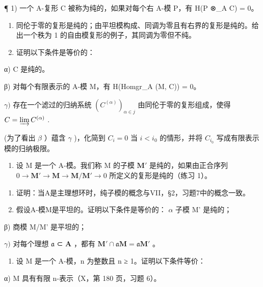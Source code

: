 
¶ 1) 一个 A-复形 C 被称为纯的，如果对每个右 A-模 P，有 H(P ⊗\_A C) = 0。

\begin{enumerate}
\def\labelenumi{\alph{enumi})}
\item
  同伦于零的复形是纯的；由平坦模构成、同调为零且有右界的复形是纯的。给出一个秩为 1 的自由模复形的例子，其同调为零但不纯。
\item
  证明以下条件是等价的：
\end{enumerate}

α) C 是纯的。

β) 对每个有限表示的 A-模 M，有 H(Homgr\_A (M, C)) = 0。

\(\gamma)\) 存在一个滤过的归纳系统 \((C^{(\alpha)})_{\alpha \in j}\) 由同伦于零的复形组成，使得 \(C = \varinjlim C^{(\alpha)}\) .

(为了看出 \(\beta\) ）蕴含 \(\gamma\) )，化简到 \(C_i = 0\) 当 \(i < i_0\) 的情形，并将 \(C_{i_0}\) 写成有限表示模的归纳极限。

\begin{enumerate}
\def\labelenumi{\arabic{enumi})}
\setcounter{enumi}{1}
\tightlist
\item
  设 M 是一个 A-模。我们称 M 的子模 \(\mathbf{M}'\) 是纯的，如果由正合序列 \(0 \to \mathbf{M}' \to \mathbf{M} \to \mathbf{M} / \mathbf{M}' \to 0\) 所定义的复形是纯的（练习 1）。
\end{enumerate}

\begin{enumerate}
\def\labelenumi{\alph{enumi})}
\item
  证明：当A是主理想环时，纯子模的概念与VII，§2，习题7中的概念一致。
\item
  假设A-模M是平坦的。证明以下条件是等价的： \(\alpha\) 子模 M' 是纯的；
\end{enumerate}

β) 商模 M/M' 是平坦的；

\(\gamma)\) 对每个理想 \(\mathfrak{a}\) ⊂ \(\mathbf{A}\) ，都有 \(\mathbf{M}' \cap \mathfrak{a}\mathbf{M} = \mathfrak{a}\mathbf{M}'\) 。

\begin{enumerate}
\def\labelenumi{\arabic{enumi})}
\setcounter{enumi}{2}
\tightlist
\item
  设 M 是一个 A-模，n 为整数且 n ≥ 1。证明以下条件等价：
\end{enumerate}

α) M 具有有限 n-表示（X，第 180 页，习题 6）。


